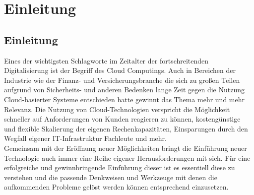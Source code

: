 \chapter{Einleitung}
\label{sec:einl}

\section{Einleitung}
Eines der wichtigsten Schlagworte im Zeitalter der fortschreitenden
Digitalisierung ist der Begriff des Cloud Computings. Auch in Bereichen
der Industrie wie der Finanz-
und Versicherungsbranche die sich zu großen Teilen aufgrund von
Sicherheits- und anderen Bedenken lange Zeit gegen die Nutzung
Cloud-basierter Systeme entschieden hatte gewinnt das Thema mehr und mehr
Relevanz. Die Nutzung von Cloud-Technologien verspricht die Möglichkeit
schneller auf Anforderungen von Kunden reagieren zu können,
kostengünstige und flexible Skalierung der eigenen Rechenkapazitäten,
Einsparungen durch den Wegfall eigener IT-Infrastruktur Fachleute und mehr.\\
Gemeinsam mit der Eröffnung neuer Möglichkeiten bringt die Einführung neuer
Technologie auch immer eine Reihe eigener Herausforderungen
mit sich. Für eine erfolgreiche und gewinnbringende Einführung dieser ist
es essentiell diese zu verstehen und die passende Denkweisen und Werkzeuge
mit denen die aufkommenden Probleme gelöst werden können entsprechend
einzusetzen.

